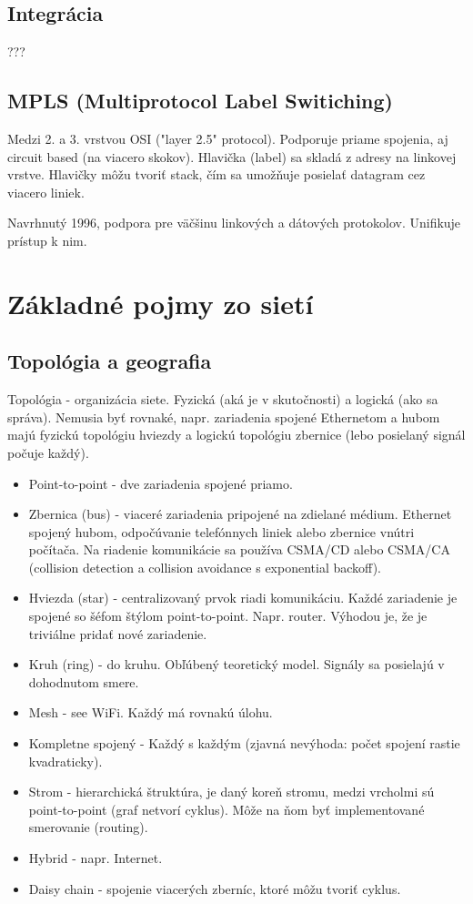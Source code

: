 \documentclass[10pt,a4paper]{article}
\begin{document}
\subsection{Integrácia}
???
               
\subsection{MPLS (Multiprotocol Label Switiching)}
Medzi 2. a 3. vrstvou OSI ("layer 2.5" protocol). 
Podporuje priame spojenia, aj circuit based (na viacero skokov).
Hlavička (label) sa skladá z adresy na linkovej vrstve. Hlavičky môžu tvoriť stack, čím sa umožňuje posielať datagram cez viacero liniek.

Navrhnutý 1996, podpora pre väčšinu linkových a dátových protokolov. Unifikuje prístup k nim. 

\section{Základné pojmy zo sietí}    
\subsection{Topológia a geografia} 
Topológia - organizácia siete. Fyzická (aká je v skutočnosti) a logická (ako sa správa). Nemusia byť rovnaké, napr. zariadenia spojené Ethernetom a hubom majú fyzickú topológiu hviezdy a logickú topológiu zbernice (lebo posielaný signál počuje každý).  
\begin{itemize}
\item Point-to-point - dve zariadenia spojené priamo.         
\item Zbernica (bus) - viaceré zariadenia pripojené na zdielané médium. Ethernet spojený hubom, odpočúvanie telefónnych liniek alebo zbernice vnútri počítača. Na riadenie komunikácie sa používa CSMA/CD alebo CSMA/CA (collision detection a collision avoidance s exponential backoff).
\item Hviezda (star) - centralizovaný prvok riadi komunikáciu. Každé zariadenie je spojené so šéfom štýlom point-to-point. Napr. router.  Výhodou je, že je triviálne pridať nové zariadenie. 
\item Kruh (ring) - do kruhu. Obľúbený teoretický model. Signály sa posielajú v dohodnutom smere. 
\item Mesh - see WiFi. Každý má rovnakú úlohu. 
\item Kompletne spojený - Každý s každým (zjavná nevýhoda: počet spojení rastie kvadraticky). 
\item Strom - hierarchická štruktúra, je daný koreň stromu, medzi vrcholmi sú point-to-point (graf netvorí cyklus). Môže na ňom byť implementované smerovanie (routing). 
\item Hybrid - napr. Internet. 
\item Daisy chain - spojenie viacerých zberníc, ktoré môžu tvoriť cyklus. 
\end{itemize}
\end{document}
